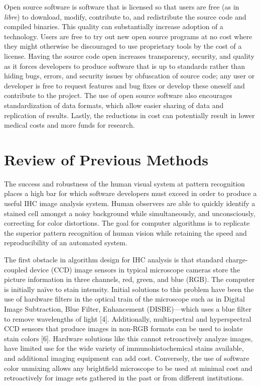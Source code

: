 \documentclass[12pt]{article}
\begin{document}
Open source software is software that is licensed so that users are free (as in \textit{libre}) to download, modify, contribute to, and redistribute the source code and compiled binaries. This quality can substantially increase adoption of a technology. Users are free to try out new open source programs at no cost where they might otherwise be discouraged to use proprietary tools by the cost of a license. Having the source code open increases transparency, security, and quality as it forces developers to produce software that is up to standards rather than hiding bugs, errors, and security issues by obfuscation of source code; any user or developer is free to request features and bug fixes or develop these oneself and contribute to the project. The use of open source software also encourages standardization of data formats, which allow easier sharing of data and replication of results. Lastly, the reductions in cost can potentially result in lower medical costs and more funds for research.


\section*{Review of Previous Methods}

The success and robustness of the human visual system at pattern recognition places a high bar for which software developers must exceed in order to produce a useful IHC image analysis system. Human observers are able to quickly identify a stained cell amongst a noisy background while simultaneously, and unconsciously, correcting for color distortions. The goal for computer algorithms is to replicate the superior pattern recognition of human vision while retaining the speed and reproducibility of an automated system.
	
The first obstacle in algorithm design for IHC analysis is that standard charge-coupled device (CCD) image sensors in typical microscope cameras store the picture information in three channels, red, green, and blue (RGB). The computer is initially na\"{i}ve to stain intensity. Initial solutions to this problem have been the use of hardware filters in the optical train of the microscope such as in Digital Image Subtraction, Blue Filter, Enhancement (DISBE)---which uses a blue filter to remove wavelengths of light [4]. Additionally, multispectral and hyperspectral CCD sensors that produce images in non-RGB formats can be used to isolate stain colors [6]. Hardware solutions like this cannot retroactively analyze images, have limited use for the wide variety of immunohistochemical stains available, and additional imaging equipment can add cost. Conversely, the use of software color unmixing allows any brightfield microscope to be used at minimal cost and retroactively for image sets gathered in the past or from different institutions. 
	
\end{document}
